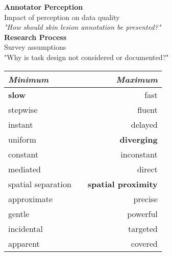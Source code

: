 \documentclass[../presentation.tex]{subfiles}
\begin{document}
\twocolumn
\null
\vfill

\large{\textbf{Annotator Perception}} \\
\large{Impact of perception on data quality} \\
\large{\textit{"How should skin lesion annotation be presented?"}} \\

\large{\textbf{Research Process}} \\
\large{Survey assumptions} \\
\large{"Why is task design not considered or documented?"}

\vfill
\pagebreak
\null
\vfill

\begin{table}[h]
\raggedleft
\begin{tabular}{l p{1cm} r}
\textit{Minimum} && \textit{Maximum} \\
\hline
\textbf{slow} && fast \\
stepwise && fluent \\
instant && delayed \\
uniform && \textbf{diverging} \\
constant && inconstant \\
mediated && direct \\
spatial separation && \textbf{spatial proximity} \\
approximate && precise \\
gentle && powerful \\
incidental && targeted \\
apparent && covered
\end{tabular}
\end{table}

\vfill
\onecolumn
\end{document}

